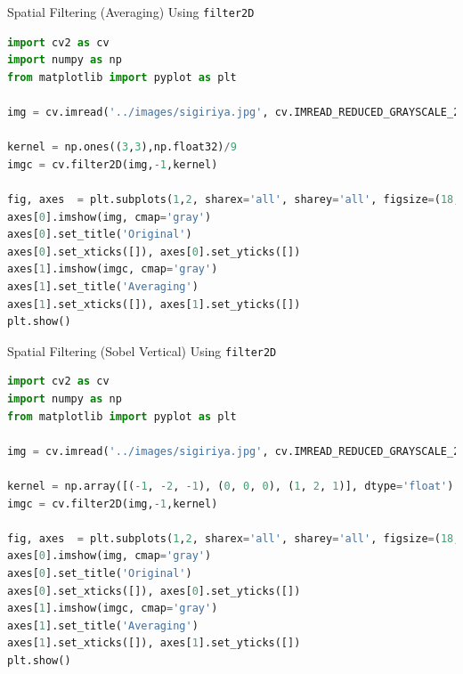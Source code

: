 \begin{frame}[t, fragile]{Spatial Filtering (Averaging) Using \lstinline!filter2D!}
    \begin{lstlisting}[caption=Spatial Filtering (Averaging), language=Python, escapechar=\@]
%matplotlib inline
import cv2 as cv
import numpy as np
from matplotlib import pyplot as plt

img = cv.imread('../images/sigiriya.jpg', cv.IMREAD_REDUCED_GRAYSCALE_2)

kernel = np.ones((3,3),np.float32)/9
imgc = cv.filter2D(img,-1,kernel)

fig, axes  = plt.subplots(1,2, sharex='all', sharey='all', figsize=(18,18))
axes[0].imshow(img, cmap='gray')
axes[0].set_title('Original')
axes[0].set_xticks([]), axes[0].set_yticks([])
axes[1].imshow(imgc, cmap='gray')
axes[1].set_title('Averaging')
axes[1].set_xticks([]), axes[1].set_yticks([])
plt.show()
    \end{lstlisting}
\end{frame}

\begin{frame}[t, fragile]{Spatial Filtering (Sobel Vertical) Using \lstinline!filter2D!}
    \begin{lstlisting}[caption=Spatial Filtering (Sobel Vertical), language=Python, escapechar=\@]
%matplotlib inline
import cv2 as cv
import numpy as np
from matplotlib import pyplot as plt

img = cv.imread('../images/sigiriya.jpg', cv.IMREAD_REDUCED_GRAYSCALE_2)

kernel = np.array([(-1, -2, -1), (0, 0, 0), (1, 2, 1)], dtype='float')
imgc = cv.filter2D(img,-1,kernel)

fig, axes  = plt.subplots(1,2, sharex='all', sharey='all', figsize=(18,18))
axes[0].imshow(img, cmap='gray')
axes[0].set_title('Original')
axes[0].set_xticks([]), axes[0].set_yticks([])
axes[1].imshow(imgc, cmap='gray')
axes[1].set_title('Averaging')
axes[1].set_xticks([]), axes[1].set_yticks([])
plt.show()
    \end{lstlisting}
\end{frame}


